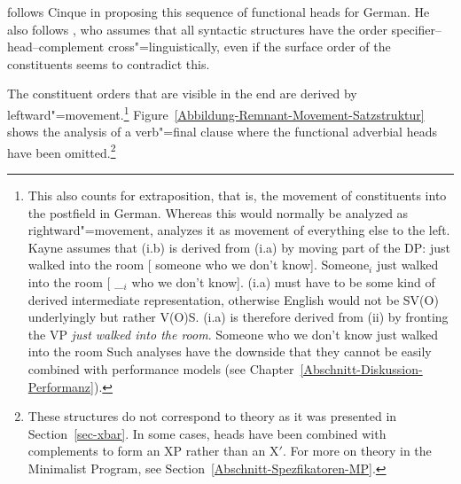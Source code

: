 \citet{Laenzlinger2004a} follows Cinque in proposing this sequence of functional heads for German. He also follows \citet{Kayne94a-u}, who assumes
that all syntactic structures have the order specifier--head--complement cross"=linguistically, even if the surface order of the constituents
seems to contradict this.%

The constituent orders that are visible in the end are derived by leftward"=movement.\footnote{\label{fn-Kayne-Extraposition}%
	This also counts for extraposition, that is, the movement of constituents into the postfield
	in German. Whereas this would normally be analyzed as rightward"=movement, \citet[Chapter~9]{Kayne94a-u} analyzes
	it as movement of everything else to the left. Kayne assumes that (i.b) is derived from (i.a) by moving part of the 
	DP:
\eal
\ex just walked into the room [ someone who we don't know].
\ex Someone$_i$ just walked into the room [ \_$_i$ who we don't know].
\zl
(i.a) must have to be some kind of derived intermediate representation, otherwise English would not be SV(O) underlyingly but rather V(O)S.
(i.a) is therefore derived from (ii) by fronting the VP \emph{just walked into the room}.
\ea
Someone who we don't know just walked into the room
\z
Such analyses have the downside that they cannot be easily combined with performance models (see Chapter~\ref{Abschnitt-Diskussion-Performanz}).%
} 
Figure~\vref{Abbildung-Remnant-Movement-Satzstruktur} shows the analysis of a verb"=final clause where the functional adverbial heads have been
omitted.\footnote{%
	These structures do not correspond to \xbar theory as it was presented in Section~\ref{sec-xbar}. In some cases, heads have been combined
	with complements to form an XP rather than an X$'$. For more on \xbar theory in the Minimalist Program, 
	see Section~\ref{Abschnitt-Spezfikatoren-MP}.
}
